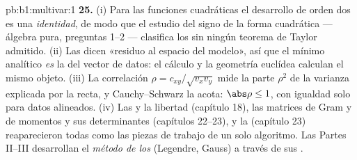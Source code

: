 \begin{solution}{pb:b1:multivar:1}
\textbf{25.} (i) Para las funciones cuadráticas el desarrollo de orden dos
es una \emph{identidad}, de modo que el estudio del signo de la forma cuadrática
--- álgebra pura, preguntas 1--2 --- clasifica los 
sin ningún teorema de Taylor admitido. (ii) Las  dicen
«residuo  al espacio del modelo», así que el mínimo
analítico \emph{es} la  del vector de datos:
el cálculo y la geometría euclídea calculan el mismo objeto. (iii)
La correlación $\rho = c_{xy}/\sqrt{v_xv_y}$ mide la parte
$\rho^2$ de la varianza explicada por la recta, y
Cauchy--Schwarz la acota: $\abs\rho \leq 1$, con igualdad solo
para datos alineados. (iv) Las  y la libertad (capítulo 18), las matrices
de Gram y de momentos y sus determinantes (capítulos 22--23),
y la  (capítulo 23) reaparecieron todas como
las piezas de trabajo de un solo algoritmo. Las Partes II--III desarrollan el
\emph{método de los } (Legendre, Gauss) a través de sus
\emph{}.
\end{solution}

